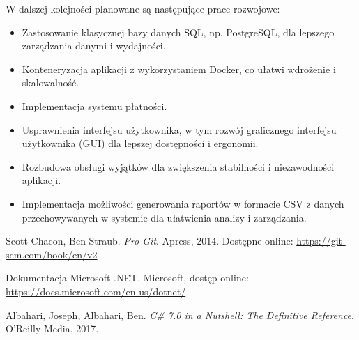 \documentclass{article}
\begin{document}
W dalszej kolejności planowane są następujące prace rozwojowe:
\begin{itemize}
    \item Zastosowanie klasycznej bazy danych SQL, np. PostgreSQL, dla lepszego zarządzania danymi i wydajności.
    \item Konteneryzacja aplikacji z wykorzystaniem Docker, co ułatwi wdrożenie i skalowalność.
    \item Implementacja systemu płatności.
    \item Usprawnienia interfejsu użytkownika, w tym rozwój graficznego interfejsu użytkownika (GUI) dla lepszej dostępności i ergonomii.
    \item Rozbudowa obsługi wyjątków dla zwiększenia stabilności i niezawodności aplikacji.
    \item Implementacja możliwości generowania raportów w formacie CSV z danych przechowywanych w systemie dla ułatwienia analizy i zarządzania.
\end{itemize}

\clearpage 
\listoffigures 

\clearpage 
\begin{thebibliography}{9}

Scott Chacon, Ben Straub. \textit{Pro Git}. Apress, 2014. Dostępne online: \url{https://git-scm.com/book/en/v2}

Dokumentacja Microsoft .NET. Microsoft, dostęp online: \url{https://docs.microsoft.com/en-us/dotnet/}

Albahari, Joseph, Albahari, Ben. \textit{C\# 7.0 in a Nutshell: The Definitive Reference}. O'Reilly Media, 2017.

\end{thebibliography}
\end{document}
